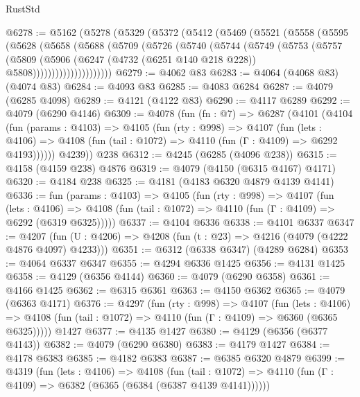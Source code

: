 \begin{lexlean}{RustStd}
\begin{coremodule}
{\begin{coremodule}
{{{{{{{{{{{{{{@6278 := @5162
    (@5278
      (@5329
        (@5372
          (@5412
            (@5469
              (@5521
                (@5558
                  (@5595
                    (@5628
                      (@5658
                        (@5688
                          (@5709
                            (@5726
                              (@5740
                                (@5744
                                  (@5749
                                    (@5753
                                      (@5757
                                        (@5809
                                          (@5906
                                            (@6247
                                              (@4732 (@6251 @140 @218 @228))
                                              @5808)))))))))))))))))))))
@6279 := @4062 @83
@6283 := @4064 (@4068 @83) (@4074 @83)
@6284 := @4093 @83
@6285 := @4083 @6284
@6287 := @4079 (@6285 @4098)
@6289 := @4121 (@4122 @83)
@6290 := @4117 @6289
@6292 := @4079 (@6290 @4146)
@6309 := @4078
    (fun (fn : @7) =>
    @6287
      (@4101
        (@4104
          (fun (params : @4103) =>
          @4105
            (fun (rty : @998) =>
            @4107
              (fun (lets : @4106) =>
              @4108 (fun (tail : @1072) => @4110 (fun (Γ : @4109) => @6292 @4193))))))
        @4239))
    @238
@6312 := @4245 (@6285 (@4096 @238))
@6315 := @4158 (@4159 @238) @4876
@6319 := @4079 (@4150 (@6315 @4167) @4171)
@6320 := @4184 @238
@6325 := @4181 (@4183 @6320 @4879 @4139 @4141)
@6336 := fun (params : @4103) =>
  @4105
    (fun (rty : @998) =>
    @4107
      (fun (lets : @4106) =>
      @4108 (fun (tail : @1072) => @4110 (fun (Γ : @4109) => @6292 (@6319 @6325)))))
@6337 := @4104 @6336
@6338 := @4101 @6337
@6347 := @4207 (fun (U : @4206) => @4208 (fun (t : @23) => @4216 (@4079 (@4222 @4876 @4097) @4233)))
@6351 := @6312 (@6338 @6347) (@4289 @6284)
@6353 := @4064 @6337 @6347
@6355 := @4294 @6336 @1425
@6356 := @4131 @1425
@6358 := @4129 (@6356 @4144)
@6360 := @4079 (@6290 @6358)
@6361 := @4166 @1425
@6362 := @6315 @6361
@6363 := @4150 @6362
@6365 := @4079 (@6363 @4171)
@6376 := @4297
    (fun (rty : @998) =>
    @4107
      (fun (lets : @4106) =>
      @4108 (fun (tail : @1072) => @4110 (fun (Γ : @4109) => @6360 (@6365 @6325)))))
    @1427
@6377 := @4135 @1427
@6380 := @4129 (@6356 (@6377 @4143))
@6382 := @4079 (@6290 @6380)
@6383 := @4179 @1427
@6384 := @4178 @6383
@6385 := @4182 @6383
@6387 := @6385 @6320 @4879
@6399 := @4319
    (fun (lets : @4106) =>
    @4108
      (fun (tail : @1072) => @4110 (fun (Γ : @4109) => @6382 (@6365 (@6384 (@6387 @4139 @4141))))))
}}}}}}}}}}}}}}
\end{coremodule}}
\end{coremodule}
\end{lexlean}
